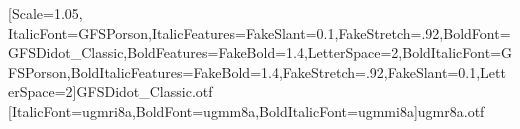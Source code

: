 [Scale=1.05, ItalicFont=GFSPorson,ItalicFeatures={FakeSlant=0.1,FakeStretch=.92},BoldFont=GFSDidot_Classic,BoldFeatures={FakeBold=1.4,LetterSpace=2},BoldItalicFont=GFSPorson,BoldItalicFeatures={FakeBold=1.4,FakeStretch=.92,FakeSlant=0.1,LetterSpace=2}]{GFSDidot_Classic.otf}
\newfontfamily{\latinfont}[ItalicFont=ugmri8a,BoldFont=ugmm8a,BoldItalicFont=ugmmi8a]{ugmr8a.otf}
